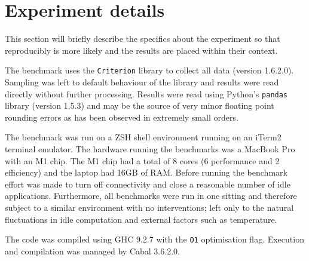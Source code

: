 \section{Experiment details}\label{sec:benchmark:experiment}
This section will briefly describe the specifics about the experiment so that
reproducibly is more likely and the results are placed within their context.

The benchmark uses the \verb|Criterion| library to collect all data (version
1.6.2.0). Sampling was left to default behaviour of the library and results were
read directly without further processing. Results were read using Python's
\verb|pandas| library (version 1.5.3) and may be the source of very minor floating point
rounding errors as has been observed in extremely small orders.

The benchmark was run on a ZSH shell environment running on an iTerm2 terminal
emulator. The hardware running the benchmarks was a MacBook Pro with an M1 chip.
The M1 chip had a total of 8 cores (6 performance and 2 efficiency) and the
laptop had 16GB of RAM. Before running the benchmark effort was made to turn off
connectivity and close a reasonable number of idle applications. Furthermore,
all benchmarks were run in one sitting and therefore subject to a similar
environment with no interventions; left only to the natural fluctuations in idle
computation and external factors such as temperature.

The code was compiled using GHC 9.2.7 with the \verb|O1| optimisation flag.
Execution and compilation was managed by Cabal 3.6.2.0.
